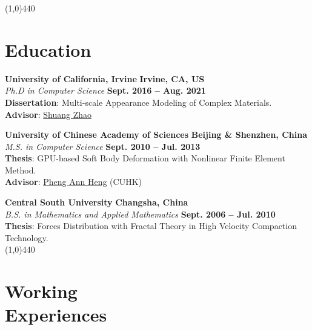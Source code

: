 \documentclass[margin,line]{resume}
\begin{document}
\begin{resume}
    \vspace{-5.0mm}
    \line(1,0){440}
    \vspace{-5.0mm}

    \section{\mysidestyle Education}
    \textbf{University of California, Irvine}       \hfill \textbf{Irvine, CA, US}  \\
    \textsl{Ph.D in Computer Science} 															\hfill \textbf{Sept. 2016 -- Aug. 2021} \\
    \textbf{Dissertation}: Multi-scale Appearance Modeling of Complex Materials. \\
    \textbf{Advisor}: \href{https://shuangz.com/}{Shuang Zhao} 

    \textbf{University of Chinese Academy of Sciences}  \hfill \textbf{Beijing \& Shenzhen, China}\\
    \textsl{M.S. in Computer Science}                 \hfill \textbf{Sept. 2010 -- Jul. 2013} \\
	\textbf{Thesis}: GPU-based Soft Body Deformation with Nonlinear Finite Element Method. \\
	\textbf{Advisor}: \href{http://www.cse.cuhk.edu.hk/~pheng/}{Pheng Ann Heng} (CUHK)

    \textbf{Central South University}      \hfill \textbf{Changsha, China} \\
    \textsl{B.S. in Mathematics and Applied Mathematics}                \hfill \textbf{Sept. 2006 -- Jul. 2010}  \\
	\textbf{Thesis}: Forces Distribution with Fractal Theory in High Velocity Compaction Technology. \\
    
    \vspace{-5.0mm}
    \line(1,0){440}
    \vspace{-5.0mm}

    \section{\mysidestyle Working \\Experiences}


\end{resume}
\end{document}
